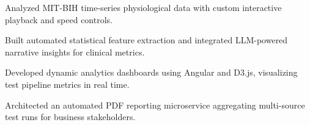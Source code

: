 \documentclass[../main.tex]{subfiles}
\begin{document}
\begin{tightemize}
\item Analyzed MIT-BIH time-series physiological data with custom interactive playback and speed controls.
\item Built automated statistical feature extraction and integrated LLM-powered narrative insights for clinical metrics.
\end{tightemize}
\sectionsep

\begin{tightemize}
\item Developed dynamic analytics dashboards using Angular and D3.js, visualizing test pipeline metrics in real time.
\item Architected an automated PDF reporting microservice aggregating multi-source test runs for business stakeholders.
\end{tightemize}
\end{document}
